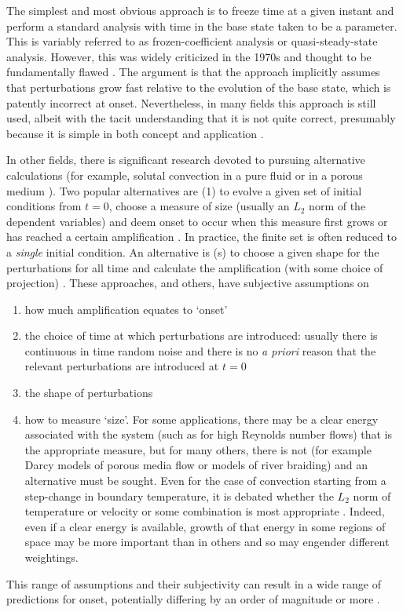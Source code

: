 \documentclass[letterpaper,prl,aps,twocolumn,reprint,superscriptaddress]{revtex4-1}
\begin{document}
The simplest and most obvious approach is to freeze time at a given instant and perform a standard analysis with time in the base state taken to be a parameter.  This is variably referred to as frozen-coefficient analysis or quasi-steady-state analysis.  However, this was widely criticized in the 1970s and thought to be fundamentally flawed \cite{GreshoSani71,Homsy}.  The argument is that the approach implicitly assumes that perturbations grow fast relative to the evolution of the base state, which is patently incorrect at onset.  Nevertheless, in many fields this approach is still used, albeit with the tacit understanding that it is not quite correct, presumably because it is simple in both concept and application \cite{Meiburg,BertozziBrenner}.

In other fields, there is significant research devoted to pursuing alternative calculations (for example, solutal convection in a pure fluid or in a porous medium \cite{references}).  Two popular alternatives are (1) to evolve a given set of initial conditions from $t=0$, choose a measure of size (usually an $L_2$ norm of the dependent variables) and deem onset to occur when this measure first grows or has reached a certain amplification \cite{Foster,GreshoSani,EnnisKingPaterson,more}.  In practice, the finite set is often reduced to a \emph{single} initial condition.  An alternative is (s) to choose a given shape for the perturbations for all time and calculate the amplification (with some choice of projection) \cite{Ben,Riaz,more}.  These approaches, and others, have subjective assumptions on
\begin{enumerate}
\itemsep=0cm
\item how much amplification equates to `onset'
\item the choice of time at which perturbations are introduced: usually there is continuous in time random noise and there is no \emph{a priori} reason that the relevant perturbations are introduced at $t=0$ \cite{GreshoSani}
\item the shape of perturbations
\item how to measure `size'.  For some applications, there may be a clear energy associated with the system (such as for high Reynolds number flows) that is the appropriate measure, but for many others, there is not (for example Darcy models of porous media flow or models of river braiding) and an alternative must be sought.  Even for the case of convection starting from a step-change in boundary temperature, it is debated whether the $L_2$ norm of temperature or velocity or some combination is most appropriate \cite{GreshoSani}.  Indeed, even if a clear energy is available, growth of that energy in some regions of space may be more important than in others and so may engender different weightings.
\end{enumerate}
This range of assumptions and their subjectivity can result in a wide range of predictions for onset, potentially differing by an order of magnitude or more \cite{example}.
\end{document}
